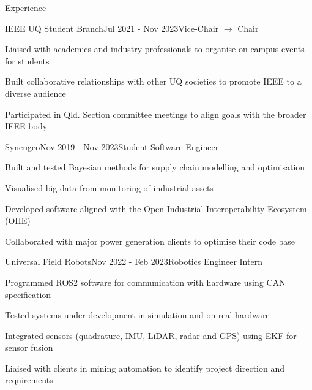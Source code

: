 \documentclass{resume} %
\begin{document}
\vspace{1em}
\begin{rSection}{Experience}

    \begin{rSubsection}{IEEE UQ Student Branch}{Jul 2021 - Nov 2023}{Vice-Chair $\rightarrow$ Chair}{}
        \item Liaised with academics and industry professionals to organise on-campus events for students
        \item Built collaborative relationships with other UQ societies to promote IEEE to a diverse audience
        \item Participated in Qld. Section committee meetings to align goals with the broader IEEE body
    \end{rSubsection}

    \begin{rSubsection}{Synengco}{Nov 2019 - Nov 2023}{Student Software Engineer}{}
        \item Built and tested Bayesian methods for supply chain modelling and optimisation
        \item Visualised big data from monitoring of industrial assets
        \item Developed software aligned with the Open Industrial Interoperability Ecosystem (OIIE)
        \item Collaborated with major power generation clients to optimise their code base
    \end{rSubsection}

    \begin{rSubsection}{Universal Field Robots}{Nov 2022 - Feb 2023}{Robotics Engineer Intern}{}
        \item Programmed ROS2 software for communication with hardware using CAN specification
        \item Tested systems under development in simulation and on real hardware
        \item Integrated sensors (quadrature, IMU, LiDAR, radar and GPS) using EKF for sensor fusion
        \item Liaised with clients in mining automation to identify project direction and requirements
    \end{rSubsection}

\end{rSection}
\end{document}

